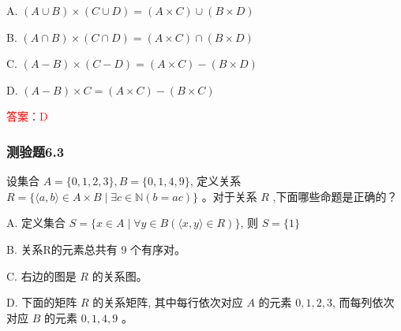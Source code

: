 \documentclass[UTF8, heading=true]{ctexart}
\begin{document}
A. 
$
(A \cup B) \times(C \cup D)=(A \times C) \cup(B \times D)
$

B. 
$
(A \cap B) \times(C \cap D)=(A \times C) \cap(B \times D)
$

C. 
$
(A-B) \times(C-D)=(A \times C)-(B \times D)
$

D. 
$
(A-B) \times C=(A \times C)-(B \times C)
$

\textcolor{red}{答案：D}

\subsubsection{测验题6.3}

设集合 $A=\{0,1,2,3\}, B=\{0,1,4,9\}$, 定义关系 $R=\{\langle a, b\rangle \in A \times B \mid \exists c \in \mathbb{N}(b=a c)\}$ 。对于关系 $R$ ,下面哪些命题是正确的？

A. 定义集合 $S=\{x \in A \mid \forall y \in B(\langle x, y\rangle \in R)\}$, 则 $S=\{1\}$

B. 关系R的元素总共有 9 个有序对。

C. 右边的图是 $R$ 的关系图。

D. 下面的矩阵 $R$ 的关系矩阵, 其中每行依次对应 $A$ 的元素 $0,1,2,3$, 而每列依次对应 $B$ 的元素 $0,1,4,9$ 。
\end{document}
